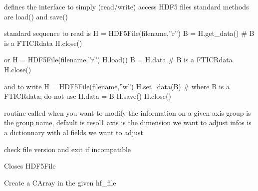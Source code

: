 \documentclass[letterpaper,10pt,openany,oneside]{sphinxmanual}
\begin{document}
\begin{fulllineitems}
\label{rst/code:File.HDF5File.HDF5File}
defines the interface to simply (read/write) access HDF5 files
standard methods are load() and save()

standard sequence to read is
H = HDF5File(filename,''r'')
B = H.get\_data()      \# B is a FTICRdata
H.close()

or
H = HDF5File(filename,''r'')
H.load()
B = H.data      \# B is a FTICRdata
H.close()

and to write
H = HDF5File(filename,''w'')
H.set\_data(B)         \# where B is a FTICRdata; do not use    H.data = B
H.save()
H.close()

\begin{fulllineitems}
\label{rst/code:File.HDF5File.HDF5File.axes_update}
routine called when you want to modify the information on a given axis
group is the group name, default is resol1
axis is the dimension we want to adjust
infos is a dictionnary with al fields we want to adjust

\end{fulllineitems}


\begin{fulllineitems}
\label{rst/code:File.HDF5File.HDF5File.checkversion}
check file version and exit if incompatible

\end{fulllineitems}


\begin{fulllineitems}
\label{rst/code:File.HDF5File.HDF5File.close}
Closes HDF5File

\end{fulllineitems}


\begin{fulllineitems}
\label{rst/code:File.HDF5File.HDF5File.createCArray}
Create a CArray in the given hf\_file


\end{fulllineitems}
\end{fulllineitems}
\end{document}
